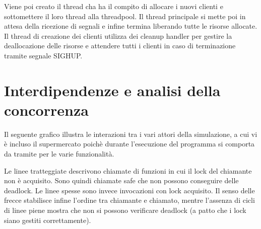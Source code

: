 \documentclass[11pt]{article}
\begin{document}
Viene poi creato il thread cha ha il compito di allocare i nuovi clienti e
sottomettere il loro thread alla threadpool. Il thread principale si mette poi
in attesa della ricezione di segnali e infine termina liberando tutte le
risorse allocate. Il thread di creazione dei clienti utilizza dei cleanup
handler per gestire la deallocazione delle risorse e attendere tutti i clienti
in caso di terminazione tramite segnale SIGHUP\@.


\section{Interdipendenze e analisi della concorrenza}
Il seguente grafico illustra le interazioni tra i vari attori della
simulazione, a cui vi è incluso il supermercato poichè durante l'esecuzione del
programma si comporta da tramite per le varie funzionalità.

Le linee tratteggiate descrivono chiamate di funzioni in cui il lock del
chiamante non è acquisito. Sono quindi chiamate safe che non possono
conseguire delle deadlock. Le linee spesse sono invece invocazioni con lock
acquisito. Il senso delle frecce stabilisce infine l'ordine tra chiamante e
chiamato, mentre l'assenza di cicli di linee piene mostra che non si possono
verificare deadlock (a patto che i lock siano gestiti correttamente).
\end{document}

